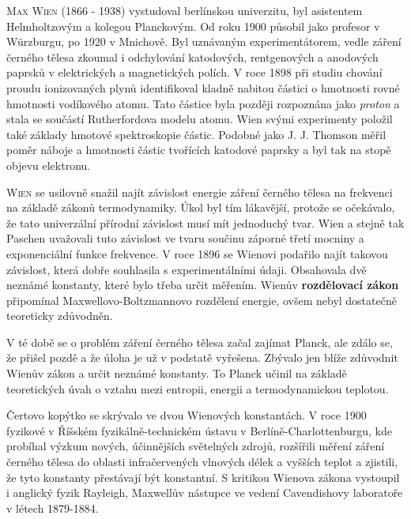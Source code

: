         \textsc{Max Wien} (1866 - 1938) vystudoval berlínskou univerzitu, byl asistentem
        Helmholtzovým a kolegou Planckovým. Od roku 1900 působil jako profesor v Würzburgu, po 1920
        v Mnichově. Byl uznávaným experimentátorem, vedle záření černého tělesa zkoumal i
        odchylování katodových, rentgenových a anodových paprsků v elektrických a magnetických
        polích. V roce 1898 při studiu chování proudu ionizovaných plynů identifikoval kladně
        nabitou částici o hmotnosti rovné hmotnosti vodíkového atomu. Tato částice byla později
        rozpoznána jako \emph{proton} a stala se součástí Rutherfordova modelu atomu. Wien svými
        experimenty položil také základy hmotové spektroskopie částic. Podobné jako J. J. Thomson
        měřil poměr náboje a hmotnosti částic tvořících katodové paprsky a byl tak na stopě objevu
        elektronu.

        \textsc{Wien} se usilovně snažil najít závislost energie záření černého tělesa na frekvenci
        na základě zákonů termodynamiky. Úkol byl tím lákavější, protože se očekávalo, že tato
        univerzální přírodní závislost musí mít jednoduchý tvar. Wien a stejně tak Paschen uvažovali
        tuto závislost ve tvaru součinu záporné třetí mocniny a exponenciální funkce frekvence. V
        roce 1896 se Wienovi podařilo najít takovou závislost, která dobře souhlasila s
        experimentálními údaji. Obsahovala dvě neznámé konstanty, které bylo třeba určit měřením.
        Wienův \textbf{rozdělovací zákon} připomínal Maxwellovo-Boltzmannovo rozdělení energie,
        ovšem nebyl dostatečně teoreticky zdůvodněn.

        V té době se o problém záření černého tělesa začal zajímat Planck, ale zdálo se, že přišel
        pozdě a že úloha je už v podstatě vyřešena. Zbývalo jen blíže zdůvodnit Wienův zákon a určit
        neznámé konstanty. To Planck učinil na základě teoretických úvah o vztahu mezi entropii,
        energii a termodynamickou teplotou. 

        Čertovo kopýtko se skrývalo ve dvou Wienových konstantách. V roce 1900 fyzikové v Říšském
        fyzikálně-technickém ústavu v Berlíně-Charlottenburgu, kde probíhal výzkum nových,
        účinnějších světelných zdrojů, rozšířili měření záření černého tělesa do oblasti
        infračervených vlnových délek a vyšších teplot a zjistili, že tyto konstanty přestávají být
        konstantní. S kritikou Wienova zákona vystoupil i anglický fyzik Rayleigh, Maxwellův
        nástupce ve vedení Cavendishovy laboratoře v létech 1879-1884.

